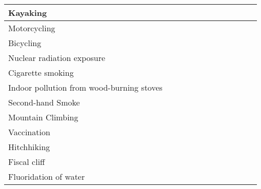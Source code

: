 \documentclass{article}
\begin{document}
{\begin{tabular}{p{2in}||c|c|c|c|c|c|c|c|c|c|c|}
Kayaking & & & & & & & & & & & \\ \hline
Motorcycling & & & & & & & & & & & \\ \hline
Bicycling & & & & & & & & & & & \\ \hline
Nuclear radiation exposure & & & & & & & & & & & \\ \hline
Cigarette smoking & & & & & & & & & & & \\ \hline
Indoor pollution from wood-burning stoves & & & & & & & & & & & \\ \hline
Second-hand Smoke & & & & & & & & & & & \\ \hline
Mountain Climbing & & & & & & & & & & & \\ \hline
Vaccination & & & & & & & & & & & \\ \hline
Hitchhiking & & & & & & & & & & & \\ \hline
Fiscal cliff & & & & & & & & & & & \\ \hline
Fluoridation of water & & & & & & & & & & & \\ \hline
\end{tabular}}
\end{document}
